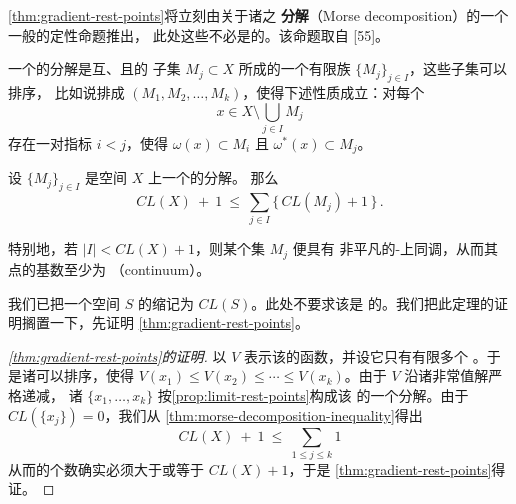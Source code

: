 \cref{thm:gradient-rest-points}将立刻由关于诸\trFlow{}之%
\textbf{\trMorse{}分解}（Morse decomposition）的一个一般的定性命题推出，%
此处这些\trFlow{}不必是\trGradientLike{}的。该命题取自 [55]。

\begin{definition}\label{def:morse-decomposition}
一个\trFlow{}的\trMorse{}分解是互\trDisjoint、\trCompact{}且\trInvariant{}的%
子集 $M_{j}\subset X$ 所成的一个有限族 $\{M_{j}\}_{j\in I}$，这些子集可以排序，%
比如说排成 $(M_{1},M_{2},\ldots,M_{k})$，使得下述性质成立：对每个
\[
x\in X\setminus\bigcup_{j\in I}M_{j}
\]
存在一对指标 $i<j$，使得 $\omega(x)\subset M_{i}$ 且 $\omega^{*}(x)\subset M_{j}$。
\end{definition}

\begin{theorem}\label{thm:morse-decomposition-inequality}
设 $\{M_{j}\}_{j\in I}$ 是\trCompact{}空间 $X$ 上一个\trFlow{}的\trMorse{}分解。%
那么
\begin{equation}\label{eq:morse-inequality}
CL(X)\ +\ 1\ \leq\ \sum_{j\in I}\bigl\{\,CL(M_{j})+1\,\bigr\}\,.
\end{equation}
\end{theorem}

特别地，若 $|I|<CL(X)+1$，则某个\trCompact{}\trInvariant{}集 $M_{j}$ 便具有%
非平凡的\trAlexander-\trSpanier{}上同调，从而其点的基数至少为%
\textbf{\trContinuum}（continuum）。

我们已把一个空间 $S$ 的\trCupLength{}缩记为 $CL(S)$。此处不要求该\trFlow{}是%
\trGradientLike{}的。我们把此定理的证明搁置一下，先证明%
\cref{thm:gradient-rest-points}。

\begin{proof}[\cref*{thm:gradient-rest-points}的证明]
以 $V$ 表示该\trGradientLike\trFlow{}的\trLyapunov{}函数，并设它只有有限多个%
\trRestPoint。于是诸\trRestPoint{}可以排序，使得%
$V(x_{1})\leq V(x_{2})\leq\cdots\leq V(x_{k})$。由于 $V$ 沿诸非常值解严格递减，%
诸\trRestPoint{} $\{x_{1},\ldots,x_{k}\}$ 按\cref{prop:limit-rest-points}构成该%
\trFlow{}的一个\trMorse{}分解。由于 $CL(\{x_{j}\})=0$，我们从%
\cref{thm:morse-decomposition-inequality}得出
\[
CL(X)\ +\ 1\ \leq\ \sum_{1\leq j\leq k}1
\]
从而\trRestPoint{}的个数确实必须大于或等于 $CL(X)+1$，于是%
\cref{thm:gradient-rest-points}得证。
\end{proof}

